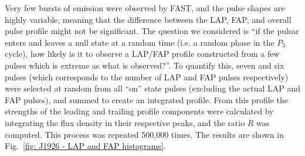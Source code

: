Very few bursts of emission were observed by FAST, and the pulse shapes are highly variable, meaning that the difference between the LAP, FAP, and overall pulse profile might not be significant. The question we considered is ``if the pulsar enters and leaves a null state at a random time (i.e. a random phase in the $P_3$ cycle), how likely is it to observe a LAP/FAP profile constructed from a few pulses which is extreme as what is observed?''.
To quantify this, seven and six pulses (which corresponds to the number of LAP and FAP pulses respectively) were selected at random from all ``on'' state pulses (excluding the actual LAP and FAP pulses), and summed to create an integrated profile. From this profile the strengths of the leading and trailing profile components were calculated by integrating the flux density in their respective peaks, and the ratio $R$ was computed. This process was repeated 500,000 times. The results are shown in Fig.~\ref{fig: J1926 - LAP and FAP histograms}.


